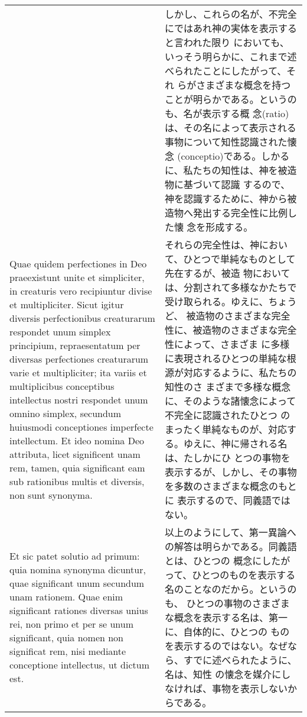 \documentclass[10pt]{jsarticle}
\begin{document}
\begin{longtable}{p{21em}p{21em}}
&

しかし、これらの名が、不完全にではあれ神の実体を表示すると言われた限り
においても、いっそう明らかに、これまで述べられたことにしたがって、それ
らがさまざまな概念を持つことが明らかである。というのも、名が表示する概
念(ratio)は、その名によって表示される事物について知性認識された懐念
(conceptio)である。しかるに、私たちの知性は、神を被造物に基づいて認識
するので、神を認識するために、神から被造物へ発出する完全性に比例した懐
念を形成する。

\\

Quae quidem perfectiones in Deo praeexistunt unite et simpliciter, in
creaturis vero recipiuntur divise et multipliciter. Sicut igitur
diversis perfectionibus creaturarum respondet unum simplex principium,
repraesentatum per diversas perfectiones creaturarum varie et
multipliciter; ita variis et multiplicibus conceptibus intellectus
nostri respondet unum omnino simplex, secundum huiusmodi conceptiones
imperfecte intellectum. Et ideo nomina Deo attributa, licet
significent unam rem, tamen, quia significant eam sub rationibus
multis et diversis, non sunt synonyma.

&

それらの完全性は、神において、ひとつで単純なものとして先在するが、被造
物においては、分割されて多様なかたちで受け取られる。ゆえに、ちょうど、
被造物のさまざまな完全性に、被造物のさまざまな完全性によって、さまざま
に多様に表現されるひとつの単純な根源が対応するように、私たちの知性のさ
まざまで多様な概念に、そのような諸懐念によって不完全に認識されたひとつ
のまったく単純なものが、対応する。ゆえに、神に帰される名は、たしかにひ
とつの事物を表示するが、しかし、その事物を多数のさまざまな概念のもとに
表示するので、同義語ではない。

\\

{\sc Et sic patet solutio ad primum}: quia nomina synonyma dicuntur,
quae significant unum secundum unam rationem. Quae enim significant
rationes diversas unius rei, non primo et per se unum significant,
quia nomen non significat rem, nisi mediante conceptione intellectus,
ut dictum est.

&

以上のようにして、第一異論への解答は明らかである。同義語とは、ひとつの
概念にしたがって、ひとつのものを表示する名のことなのだから。というのも、
ひとつの事物のさまざまな概念を表示する名は、第一に、自体的に、ひとつの
ものを表示するのではない。なぜなら、すでに述べられたように、名は、知性
の懐念を媒介にしなければ、事物を表示しないからである。


\end{longtable}
\end{document}
